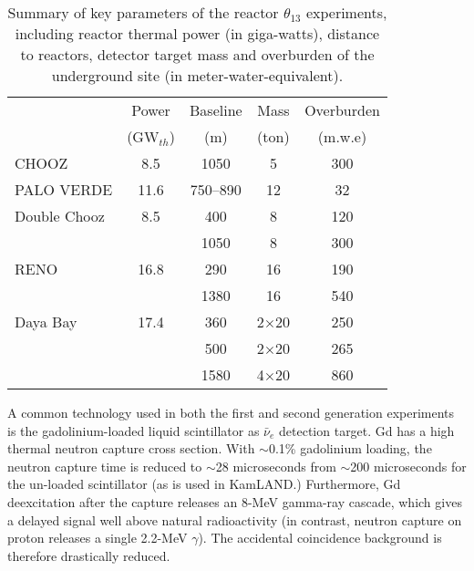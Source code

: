 \begin{table}[!htb]
  \begin{tabular}{lcccc}
  \hline
  & Power & Baseline & Mass & Overburden \\
  & (GW$_{th}$) & (m) & (ton) & (m.w.e)    \\
  \hline
  CHOOZ        & 8.5  & 1050  & 5    & 300\\
  PALO VERDE   & 11.6 & 750--890  & 12  & 32\\
  \hline
  Double Chooz & 8.5  & 400  & 8  & 120\\
               &      & 1050 & 8  & 300\\
  RENO         & 16.8 & 290  & 16   & 190\\
               &      & 1380 & 16   & 540\\
  Daya Bay     & 17.4 & 360  & 2$\times$20   & 250\\
               &      & 500  & 2$\times$20   & 265\\
               &      & 1580 & 4$\times$20   & 860\\
  \hline
  \end{tabular}
  \caption{Summary of key parameters of the reactor $\theta_{13}$ experiments, including reactor thermal power (in giga-watts), distance to reactors, detector target mass and overburden of the underground site (in meter-water-equivalent).}
\label{tab:theta13}
\end{table}

A common technology used in both the first and second generation experiments is the gadolinium-loaded liquid scintillator as $\bar\nu_{e}$ detection target. Gd has a high thermal neutron capture cross section. With $\sim$0.1\% gadolinium loading, the neutron capture time is reduced to $\sim$28 microseconds from $\sim$200 microseconds for the un-loaded scintillator (as is used in KamLAND.) Furthermore, Gd deexcitation after the capture releases an 8-MeV gamma-ray cascade, which gives a delayed signal well above natural radioactivity (in contrast, neutron capture on proton releases a single 2.2-MeV $\gamma$). The accidental coincidence background is therefore drastically reduced.

